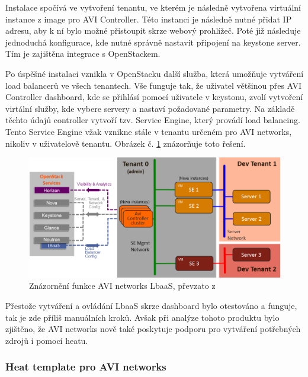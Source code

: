 Instalace spočívá ve vytvoření tenantu, ve kterém je následně vytvořena virtuální instance z image pro AVI Controller. Této instanci je následně nutné přidat IP adresu, aby k ní bylo možné přistoupit skrze webový prohlížeč. Poté již následuje jednoduchá konfigurace, kde nutné správně nastavit připojení na keystone server. Tím je zajištěna integrace s OpenStackem. 

Po úspěšné instalaci vznikla v OpenStacku další služba, která umožňuje vytváření load balancerů ve všech tenantech. Vše funguje tak, že uživatel většinou přes AVI Controller dashboard, kde se přihlásí pomocí uživatele v keystonu, zvolí vytvoření virtální služby, kde vybere servery a nastaví požadované parametry. Na základě těchto údajů controller vytvoří tzv. Service Engine, který provádí load balancing. Tento Service Engine vžak vznikne stále v tenantu určeném pro AVI networks, nikoliv v uživatelově tenantu. Obrázek č. \ref{fig:avi} znázorňuje toto řešení.

\begin{figure}[h]
\begin{centering}
\includegraphics[scale=0.5]{images/avi}
\par\end{centering}
\caption{Znázornění funkce AVI networks LbaaS, převzato z \cite{avi_networks} \label{fig:avi}}
\end{figure}

Přestože vytváření a ovládání LbaaS skrze dashboard bylo otestováno a funguje, tak je zde příliš manuálních kroků. Avšak při analýze tohoto produktu bylo zjištěno, že AVI networks nově také poskytuje podporu pro vytváření potřebných zdrojů i pomocí heatu. 

\subsubsection{Heat template pro AVI networks}

